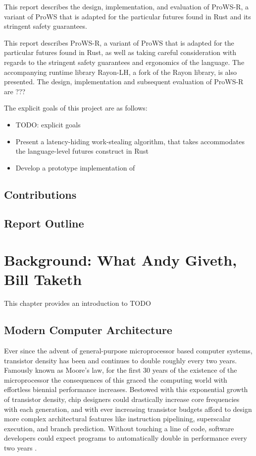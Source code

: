 \documentclass[bsc,frontabs,singlespacing,parskip,deptreport,normalheadings]{infthesis}
\begin{document}
This report describes the
design, implementation, and evaluation of ProWS-R, a variant of ProWS that is
adapted for the particular futures found in Rust and its stringent safety
guarantees.

This report describes ProWS-R, a variant of ProWS that is adapted for the
particular futures found in Rust, as well as taking careful consideration with
regards to the stringent safety guarantees and ergonomics of the language. The
accompanying runtime library Rayon-LH, a fork of the Rayon library, is also
presented. The design, implementation and subsequent evaluation of ProWS-R are
???

The explicit goals of this project are as follows:

\begin{itemize}
    \item TODO: explicit goals
    \item Present a latency-hiding work-stealing algorithm, that takes
        accommodates the language-level futures construct in Rust
    \item Develop a prototype implementation of 
\end{itemize}

\section{Contributions}

\section{Report Outline}


\chapter{Background: What Andy Giveth, Bill Taketh}

This chapter provides an introduction to TODO

\section{Modern Computer Architecture}

Ever since the advent of general-purpose microprocessor based computer systems,
transistor density has been and continues to double roughly every two years.
Famously known as Moore's law, for the first 30 years of the existence of the
microprocessor the consequences of this graced the computing world with
effortless biennial performance increases. Bestowed with this exponential growth
of transistor density, chip designers could drastically increase core
frequencies with each generation, and with ever increasing transistor budgets
afford to design more complex architectural features like instruction
pipelining, superscalar execution, and branch prediction. Without touching a
line of code, software developers could expect programs to automatically double
in performance every two years \cite{hennessy_new_2019}.
\end{document}
